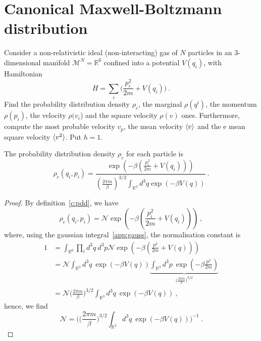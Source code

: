 \section{Canonical Maxwell-Boltzmann distribution}

    \begin{exercise}
        Consider a non-relativistic ideal (non-interacting) gas of $N$ particles in an $3$-dimensional manifold $\mathcal M^N = \mathbb R^6$ confined into a potential $V(q_i)$, with Hamiltonian
        \begin{equation*}
            H = \sum_i \Big ( \frac{p^2_i}{2m} + V(q_i) \Big ) ~.
        \end{equation*}
        Find the probability distribution density $\rho_c$, the marginal $\rho(q^i)$, the momentum $\rho(p_i)$, the velocity $\rho(v_i$) and the square velocity $\rho(v)$ ones. Furthermore, compute the most probable velocity $v_p$, the mean velocity $\langle v\rangle$ and the e mean square velocity $\langle v^2\rangle$. Put $h = 1$. 
    \end{exercise}

    The probability distribution density $\rho_c$ for each particle is 
    \begin{equation*}
        \rho_c (q_i, p_i) = \frac{\exp (- \beta ( \frac{p^2_i}{2m} + V(q_i) ))}{(\frac{2\pi m}{\beta})^{3/2} \int_{\mathbb R^3} d^3 q \exp(- \beta V(q))} ~.
    \end{equation*}
    \begin{proof}
        By definition~\eqref{c:pdd}, we have
        \begin{equation*}
            \rho_c (q_i, p_i) = \mathcal N \exp (- \beta ( \frac{p^2_i}{2m} + V(q_i) )) ~,
        \end{equation*}
        where, using the gaussian integral~\eqref{app:gauss}, the normalisation constant is  
        \begin{equation*}
        \begin{aligned}
            1 & = \int_{\mathbb R^6} \prod_i d^3 q ~ d^3 p \mathcal N \exp(- \beta ( \frac{p^2}{2m} + V(q))) \\ & = \mathcal N \int_{\mathbb R^3} d^3 q ~ \exp(- \beta V(q))  \underbrace{\int_{\mathbb R^3} d^3 p ~ \exp(- \beta \frac{p^2}{2m})}_{\Big ( \frac{2\pi m}{\beta}\Big)^{3/2}} \\ & = \mathcal N  \Big ( \frac{2\pi m}{\beta}\Big)^{3/2} \int_{\mathbb R^3} d^3 q ~ \exp(- \beta V(q)) ~,
        \end{aligned}
        \end{equation*}
        hence, we find
        \begin{equation*}
            \mathcal N = \Big ( \Big ( \frac{2\pi m}{\beta}\Big)^{3/2} \int_{\mathbb R^3} d^3 q ~ \exp(- \beta V(q))  \Big )^{-1} ~.
        \end{equation*}
    \end{proof}


